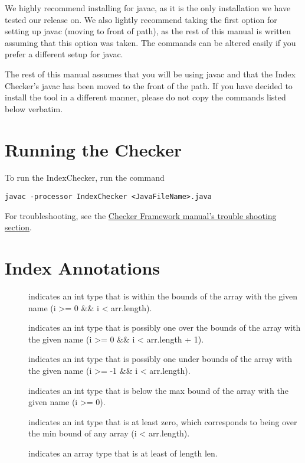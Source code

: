 We highly recommend installing for javac, as it is the only installation we
have tested our release on. We also lightly recommend taking the first option
for setting up javac (moving to front of path), as the rest of this manual
is written assuming that this option was taken. The commands can be altered
easily if you prefer a different setup for javac.

The rest of this manual assumes that you will be using javac and that the Index
Checker's javac has been moved to the front of the path. If you have decided to
install the tool in a different manner, please do not copy the commands listed
below verbatim.

\section{Running the Checker\label{index-running}}

To run the IndexChecker, run the command

\begin{Verbatim}
javac -processor IndexChecker <JavaFileName>.java
\end{Verbatim}

For troubleshooting, see the \href{http://types.cs.washington.edu/checker-framework/current/checker-framework-manual.html#troubleshooting}
{Checker Framework manual's trouble shooting section}.

\section{Index Annotations\label{index-annotations}}

\begin{description}
\item[]
	indicates an int type that is within the bounds of the array with the given
	name (i >= 0 \&\& i < arr.length).
\item[]
	indicates an int type that is possibly one over the bounds of the array with
	the given name (i >= 0 \&\& i < arr.length + 1).
\item[]
	indicates an int type that is possibly one under bounds of the array with the
	given name (i >= -1 \&\& i < arr.length).
\item[]
	indicates an int type that is below the max bound of the array with the given
	name (i >= 0).
\item[]
	indicates an int type that is at least zero, which corresponds to being over
	the min bound of any array (i < arr.length).
\item[]
	indicates an array type that is at least of length len.
\end{description}

